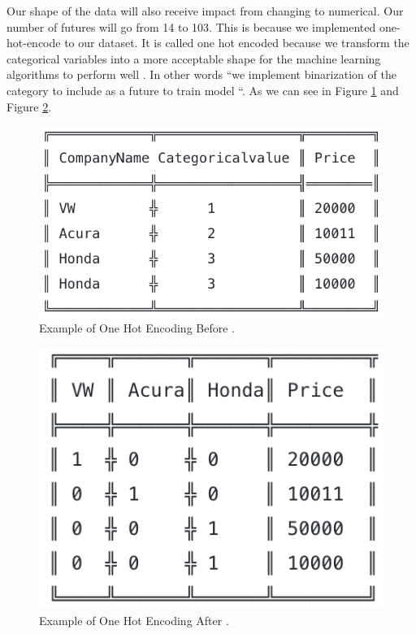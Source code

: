 \documentclass[sigconf]{acmart}
\begin{document}
\par Our shape of the data will also receive impact from changing to numerical. Our number of futures will go from 14 to 103. This is because we implemented one-hot-encode to our dataset. It is called one hot encoded because we transform the categorical variables into a more acceptable shape for the machine learning algorithms to perform well \cite{www-hackernoon}. In other words ``we implement binarization of the category to include as a future to train model \cite{www-hackernoon}``. As we can see in Figure \ref{fig:one-hot-before} and Figure \ref{fig:one-hot-after}.

 \begin{figure}[!ht]
  \centering
      \includegraphics[width=\columnwidth]{images/one-hot-before.png}
  \caption{Example of One Hot Encoding Before \cite{www-hackernoon}.}\label{fig:one-hot-before}
\end{figure}

 \begin{figure}[!ht]
  \centering
      \includegraphics[width=\columnwidth]{images/one-hot-after.png}
  \caption{Example of One Hot Encoding After \cite{www-hackernoon}.}\label{fig:one-hot-after}
\end{figure}
\end{document}
